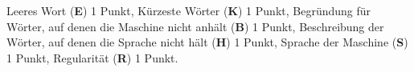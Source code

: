 \begin{bewertung}
Leeres Wort ({\bf E}) 1 Punkt,
Kürzeste Wörter ({\bf K}) 1 Punkt,
Begründung für Wörter, auf denen die Maschine nicht anhält ({\bf B})
1 Punkt,
Beschreibung der Wörter, auf denen die Sprache nicht hält ({\bf H}) 1 Punkt,
Sprache der Maschine ({\bf S}) 1 Punkt,
Regularität ({\bf R}) 1 Punkt.
\end{bewertung}

